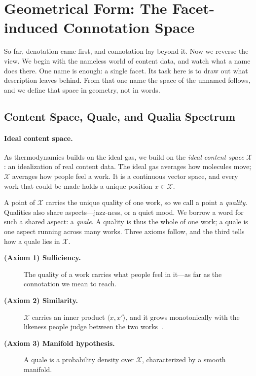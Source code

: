 \section{Geometrical Form: The Facet-induced Connotation Space}\label{sec:mathematics}

So far, denotation came first, and connotation lay beyond it. Now we reverse the
view. We begin with the nameless world of content data, and watch what a name
does there. One name is enough: a single facet. Its task here is to draw out
what description leaves behind. From that one name the space of the unnamed
follows, and we define that space in geometry, not in words.


\subsection{Content Space, Quale, and Qualia
    Spectrum}\label{subsec:content_space}

\paragraph{Ideal content space.}
As thermodynamics builds on the ideal gas, we build on the \textit{ideal
    content space} $\mathcal{X}$: an idealization of real content data. The ideal
gas averages how molecules move; $\mathcal{X}$ averages how people feel a
work. It is a continuous vector space, and every work that could be made
holds a unique position $x \in \mathcal{X}$.

A point of $\mathcal{X}$ carries the unique quality of one work, so we call a
point a \textit{quality}. Qualities also share aspects---jazz-ness, or a
quiet mood. We borrow a word for such a shared aspect: a \textit{quale}. A
quality is thus the whole of one work; a quale is one aspect running across
many works. Three axioms follow, and the third tells how a quale lies in
$\mathcal{X}$.

\begin{description}
    \item[\textbf{(Axiom 1) Sufficiency.}] The quality of a work carries what
          people feel in it---as far as the connotation we mean to reach.
    \item[\textbf{(Axiom 2) Similarity.}] $\mathcal{X}$ carries an inner
          product $\langle x, x' \rangle$, and it grows monotonically
          with the likeness people judge between the two
          works~\citep{Shepard19871317}.
    \item[\textbf{(Axiom 3) Manifold hypothesis.}] A quale is a probability
          density over $\mathcal{X}$, characterized by a smooth manifold.
\end{description}

